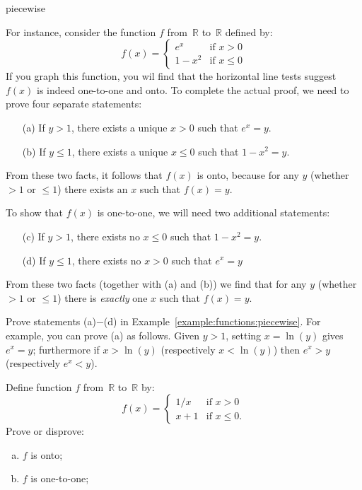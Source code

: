 \begin{example}{piecewise}

  For instance, consider the function $f$ from~$\mathbb{R}$ to~$\mathbb{R}$ defined by:
$$ f(x) = 
\begin{cases}
e^x & \mbox{if $x > 0$} \\
1 - x^2 & \mbox{if $x \le 0$}
\end{cases} $$
If you graph this function, you wil find that the horizontal line tests suggest $f(x)$ is indeed one-to-one and onto. To complete the actual proof, we need to prove four separate statements:
\begin{enumerate}[(a)] 
\item[(a)]
If $y > 1$, there exists a unique $x>0$ such that $e^x = y$.
\item[(b)]
If $y \le 1$, there exists a unique $x \le 0$ such that $1-x^2 = y$.
\end{enumerate}
From these two facts, it follows that $f(x)$ is onto, because for any $y$ (whether $>1$ or $\le 1$) there exists an $x$ such that $f(x)=y$. 
\bigskip


To show that $f(x)$ is one-to-one, we will need two additional statements:
\begin{enumerate}[(a)]
\setcounter{enumi}{2} 
\item[(c)]
If $y > 1$, there exists no $x\le0$ such that $1 - x^2 = y$.
\item[(d)]
If $y \le 1$, there exists no $x > 0$ such that $e^x = y$
\end{enumerate}
From these two facts (together with (a) and (b)) we find that for any $y$ (whether $>1$ or $\le 1$) there is \emph{exactly} one $x$ such that $f(x)=y$.
\end{example}
 
\begin{exercise}{}
Prove statements (a)$-$(d) in Example~\ref{example:functions:piecewise}.  For example, you can prove (a)  as follows. Given $y>1$, setting $x = \ln(y)$ gives $e^x = y$; furthermore if $x > \ln(y)$ (respectively  $x < \ln(y)$) then $e^x > y$ (respectively $e^x < y$).
\end{exercise}



\begin{exercise}{} \label{OntoCasesExer}
 Define function $f$  from~$\mathbb{R}$ to~$\mathbb{R}$ by:
$$ f(x) = 
\begin{cases}
1/x & \mbox{if $x > 0$} \\
x + 1 & \mbox{if $x \le 0$.}
\end{cases} $$
Prove or disprove:
\begin{multicols}{2}
 \begin{enumerate}[(a)]
 \item \label{OntoCasesExer-fOnto}
 $f$ is onto;
 \item \label{OntoCasesExer-fNot11}
 $f$ is one-to-one;
\end{enumerate}
\end{multicols}
\end{exercise}

